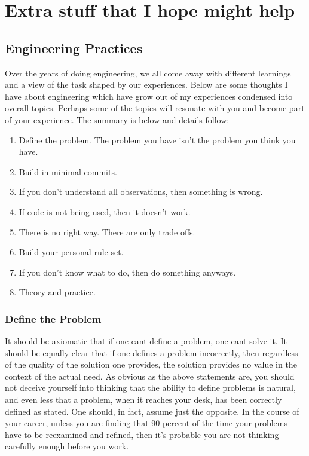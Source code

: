 
\appendix
{}
\chapter{Extra stuff that I hope might help}
\label{introA} %

\section{Engineering Practices}
\label{sec:A1}
Over the years of doing engineering, we all come away with different learnings and a view of the task shaped by our experiences.
Below are some thoughts I have about engineering which have grow out of my experiences condensed into overall topics. Perhaps some
of the topics will resonate with you and become part of your experience. The summary is below and details follow:
\begin{enumerate}
\item Define the problem. The problem you have isn't the problem you think you have.
\item Build in minimal commits.
\item If you don't understand all observations, then something is wrong.
\item If code is not being used, then it doesn't work.
\item There is no right way. There are only trade offs.
\item Build your personal rule set.
\item If you don't know what to do, then do something anyways.
\item Theory and practice.
\end{enumerate}

\subsection{Define the Problem}
\label{sec:A2}
It should be axiomatic that if one cant define a problem, one cant solve it. It should be equally clear that if one defines a
problem incorrectly, then regardless of the quality of the solution one provides, the solution provides no value in the context of
the actual need.
As obvious as the above statements are, you should not deceive yourself into thinking that the ability to define
problems is natural, and even less that a problem, when it reaches your desk, has been correctly defined as stated. One should, in fact,
assume just the opposite.
In the course of your career, unless you are finding that 90 percent of the time your problems have to be reexamined and refined,
then it's probable you are not thinking carefully enough before you work.

